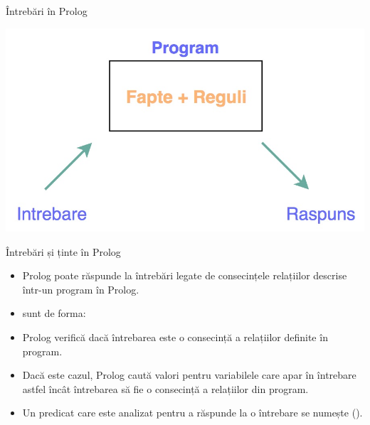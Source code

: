 \documentclass[xcolor=pdftex,romanian,colorlinks]{beamer}
\begin{document}
\begin{frame}{\^Intrebări în Prolog}

\begin{center}
\includegraphics[scale=.3]{images/Prolog}
\end{center}

\end{frame}


\begin{frame}{\^Intrebări și ținte în Prolog}

\begin{itemize}
	\item Prolog poate răspunde la întrebări legate de consecințele relațiilor descrise într-un program în Prolog.
	\smallskip
	\item {} sunt de forma:
	\begin{center}
	\end{center}
	\smallskip
	\item Prolog verifică dacă întrebarea este o consecință a relațiilor definite în program.
	\smallskip
	\item Dacă este cazul, Prolog caută valori pentru variabilele care apar în întrebare astfel încât întrebarea să fie o consecință a relațiilor din program.
\smallskip	
	\item Un predicat care este analizat pentru a răspunde la o întrebare se numește  ().
\end{itemize}
\end{frame}
\end{document}
